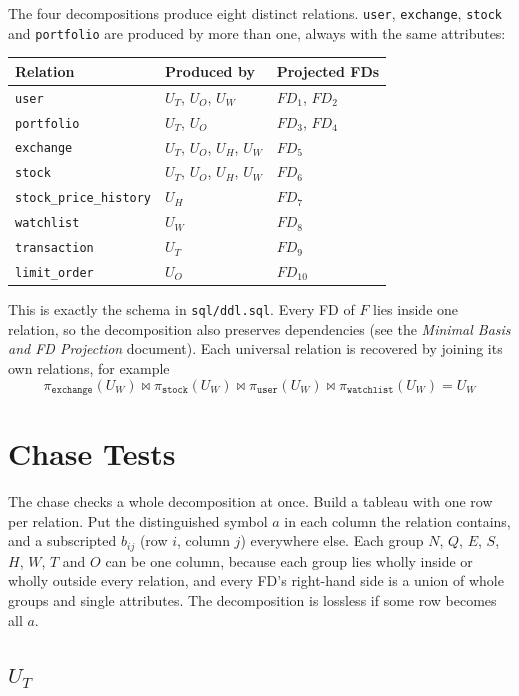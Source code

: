 \documentclass{article}
\begin{document}
The four decompositions produce eight distinct relations. \texttt{user}, \texttt{exchange}, \texttt{stock} and \texttt{portfolio} are produced by more than one, always with the same attributes:
\begin{center}
\begin{tabular}{l l l}
  \toprule
  \textbf{Relation} & \textbf{Produced by} & \textbf{Projected FDs} \\
  \midrule
  \texttt{user} & $U_T$, $U_O$, $U_W$ & $FD_1$, $FD_2$ \\
  \texttt{portfolio} & $U_T$, $U_O$ & $FD_3$, $FD_4$ \\
  \texttt{exchange} & $U_T$, $U_O$, $U_H$, $U_W$ & $FD_5$ \\
  \texttt{stock} & $U_T$, $U_O$, $U_H$, $U_W$ & $FD_6$ \\
  \texttt{stock\_price\_history} & $U_H$ & $FD_7$ \\
  \texttt{watchlist} & $U_W$ & $FD_8$ \\
  \texttt{transaction} & $U_T$ & $FD_9$ \\
  \texttt{limit\_order} & $U_O$ & $FD_{10}$ \\
  \bottomrule
\end{tabular}
\end{center}
This is exactly the schema in \texttt{sql/ddl.sql}. Every FD of $F$ lies inside one relation, so the decomposition also preserves dependencies (see the \emph{Minimal Basis and FD Projection} document). Each universal relation is recovered by joining its own relations, for example
\[
  \pi_{\texttt{exchange}}(U_W) \bowtie \pi_{\texttt{stock}}(U_W) \bowtie \pi_{\texttt{user}}(U_W) \bowtie \pi_{\texttt{watchlist}}(U_W) = U_W
\]

\section{Chase Tests}

The chase checks a whole decomposition at once. Build a tableau with one row per relation. Put the distinguished symbol $a$ in each column the relation contains, and a subscripted $b_{ij}$ (row $i$, column $j$) everywhere else. Each group $N$, $Q$, $E$, $S$, $H$, $W$, $T$ and $O$ can be one column, because each group lies wholly inside or wholly outside every relation, and every FD's right-hand side is a union of whole groups and single attributes. The decomposition is lossless if some row becomes all $a$.

\subsection{$U_T$}
\end{document}
